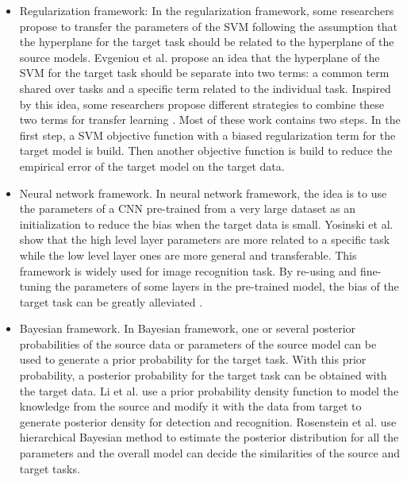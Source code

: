 \begin{itemize}
	\item Regularization framework: In the regularization framework, some researchers propose to transfer the parameters of the SVM following the assumption that the hyperplane for the target task should be related to the hyperplane of the source models. Evgeniou et al. \cite{evgeniou2004regularized} propose an idea that the hyperplane of the SVM for the target task should be separate into two terms: a common term shared over tasks and a specific term related to the individual task. Inspired by this idea, some researchers propose different strategies to combine these two terms for transfer learning \cite{aytar2011tabula} \cite{tommasi2010safety} \cite{yang2007cross}. Most of these work contains two steps. In the first step, a SVM objective function with a biased regularization term for the target model is build. Then another objective function is build to reduce the empirical error of the target model on the target data.
	\item Neural network framework. In neural network framework, the idea is to use the parameters of a CNN pre-trained from a very large dataset as an initialization to reduce the bias when the target data is small. Yosinski et al. \cite{yosinski2014transferable} show that the high level layer parameters are more related to a specific task while the low level layer ones are more general and transferable. This framework is widely used for image recognition task. By re-using and fine-tuning the parameters of some layers in the pre-trained model, the bias of the target task can be greatly alleviated \cite{Chatfield14} \cite{hoffman2013one}  \cite{zeiler2014visualizing} \cite{NIPS2014_Zhou}. 
	\item Bayesian framework. In Bayesian framework, one or several posterior probabilities of the source data or parameters of the source model can be used to generate a prior probability for the target task. With this prior probability, a posterior probability for the target task can be obtained with the target data.
	Li et al. \cite{fei2006one} use a prior probability density function to model the knowledge from the source and modify it with the data from target to generate posterior density for detection and recognition. 
	Rosenstein et al. \cite{rosenstein2005transfer} use hierarchical Bayesian method to estimate the posterior distribution for all the parameters and the overall model can decide the similarities of the source and target tasks. 
\end{itemize}



